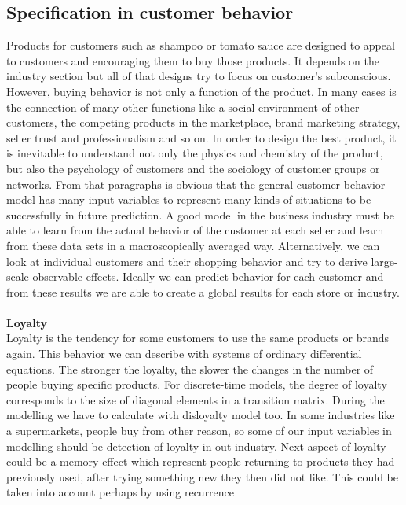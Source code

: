 \subsection{Specification in customer behavior} \label{subsec:specification}
Products for customers such as shampoo or tomato sauce are designed to appeal to customers and encouraging them to buy those products.
It depends on the industry section but all of that designs try to focus on customer’s subconscious.
However, buying behavior is not only a function of the product.
In many cases is the connection of many other functions like a social environment of other customers, the competing products in the marketplace,
brand marketing strategy, seller trust and professionalism and so on.
In order to design the best product, it is inevitable to understand not only the physics and chemistry of the product,
but also the psychology of customers and the sociology of customer groups or networks\cite{patel}.
From that paragraphs is obvious that the general customer behavior model has many input variables to represent many
kinds of situations to be successfully in future prediction.
A good model in the business industry must be able to learn from the actual behavior of the customer at each seller and learn from these data sets in a macroscopically averaged way.
Alternatively, we can look at individual customers and their shopping behavior and try to derive large-scale observable effects.
Ideally we can predict behavior for each customer and from these results we are able to create a global results for each store or industry.\\
\\
\textbf{Loyalty} \label{subsec:loyalty}\\
Loyalty is the tendency for some customers to use the same products or brands again. This behavior we can describe with systems of ordinary differential equations.
The stronger the loyalty, the slower the changes in the number of people buying specific products.
For discrete-time models, the degree of loyalty corresponds to the size of diagonal elements in a transition matrix.
During the modelling we have to calculate with  disloyalty model too. In some industries like a supermarkets,
people buy from other reason, so some of our input variables in modelling should be detection of loyalty in out industry.
Next aspect of loyalty could be a memory effect which represent people returning to products they had previously used,
after trying something new they then did not like. This could be taken into account perhaps by using recurrence
